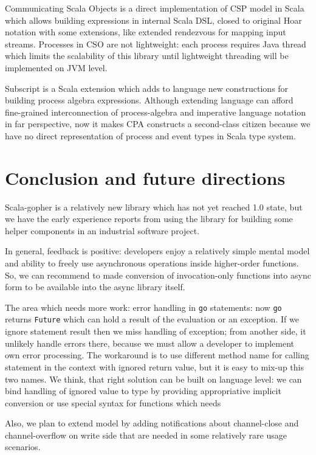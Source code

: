 \documentclass[12pt]{article}
\begin{document}
 Communicating Scala Objects\cite{CSO} is a direct implementation of CSP model in Scala which allows
building expressions in internal Scala DSL, closed to original Hoar notation with some extensions, like extended rendezvous for mapping input streams.  Processes in CSO are not lightweight: each process requires Java thread which limits the scalability of this library until lightweight threading will be implemented on JVM level.

 Subscript\cite{vanDelft:2013:DCL:2489837.2489849} is a Scala extension which adds to language new constructions for building process algebra expressions. Although extending language can afford fine-grained interconnection of process-algebra and imperative language notation in far perspective, now it makes CPA constructs a second-class citizen because we have no direct representation of process and event types in Scala type system.

  
\section{ Conclusion and future directions }
  
  Scala-gopher is a relatively new library which has not yet reached 1.0 state, but we have the early experience
 reports from using the library for building some helper components in an industrial software project. 

 In general, feedback is positive: developers enjoy a relatively simple mental model and ability to freely use asynchronous operations inside higher-order functions.  So, we can recommend to made conversion of invocation-only functions into async form to be available into the async library itself. 

 The area which needs more work: error handling in \verb|go| statements:  now \verb|go| returns 
\verb|Future| which can hold a result of the evaluation or an exception. If we ignore statement result then we miss handling of exception; from another side, it unlikely handle errors there, because we must allow a developer to implement own error processing. The workaround is to use different method name for calling statement in the context with ignored return value, but it is easy to mix-up this two names.
 We think, that right solution can be built on language level: we can bind handling of ignored value to type by providing appropriative implicit conversion or use special syntax for functions which needs 
 
 Also, we plan to extend model by adding notifications about channel-close and channel-overflow on write side that are needed in some relatively rare usage scenarios.
\end{document}

